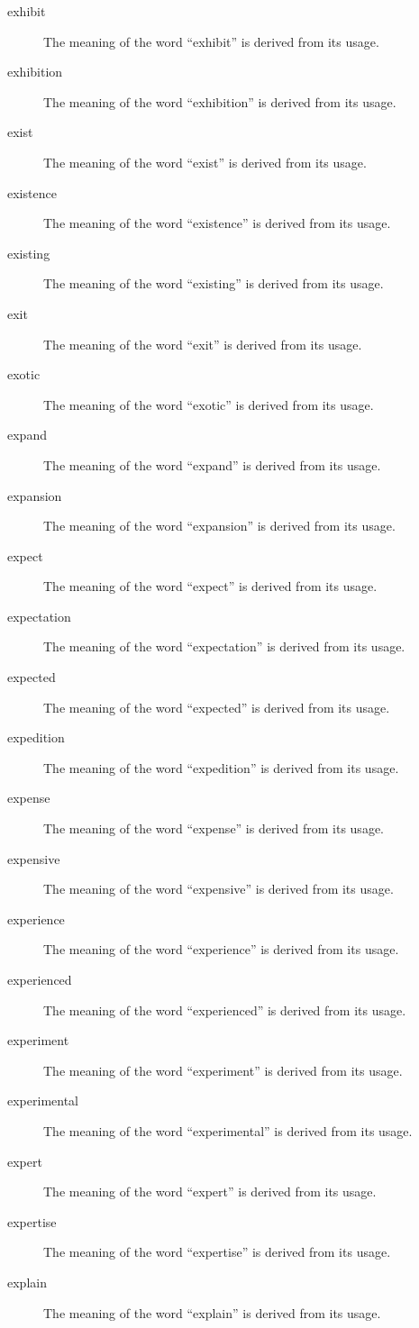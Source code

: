 \documentclass[12pt, letterpaper]{memoir}
\begin{document}
\begin{description}
\item[exhibit] The meaning of the word ``exhibit'' is derived from its usage.
\item[exhibition] The meaning of the word ``exhibition'' is derived from its usage.
\item[exist] The meaning of the word ``exist'' is derived from its usage.
\item[existence] The meaning of the word ``existence'' is derived from its usage.
\item[existing] The meaning of the word ``existing'' is derived from its usage.
\item[exit] The meaning of the word ``exit'' is derived from its usage.
\item[exotic] The meaning of the word ``exotic'' is derived from its usage.
\item[expand] The meaning of the word ``expand'' is derived from its usage.
\item[expansion] The meaning of the word ``expansion'' is derived from its usage.
\item[expect] The meaning of the word ``expect'' is derived from its usage.
\item[expectation] The meaning of the word ``expectation'' is derived from its usage.
\item[expected] The meaning of the word ``expected'' is derived from its usage.
\item[expedition] The meaning of the word ``expedition'' is derived from its usage.
\item[expense] The meaning of the word ``expense'' is derived from its usage.
\item[expensive] The meaning of the word ``expensive'' is derived from its usage.
\item[experience] The meaning of the word ``experience'' is derived from its usage.
\item[experienced] The meaning of the word ``experienced'' is derived from its usage.
\item[experiment] The meaning of the word ``experiment'' is derived from its usage.
\item[experimental] The meaning of the word ``experimental'' is derived from its usage.
\item[expert] The meaning of the word ``expert'' is derived from its usage.
\item[expertise] The meaning of the word ``expertise'' is derived from its usage.
\item[explain] The meaning of the word ``explain'' is derived from its usage.

\end{description}
\end{document}
